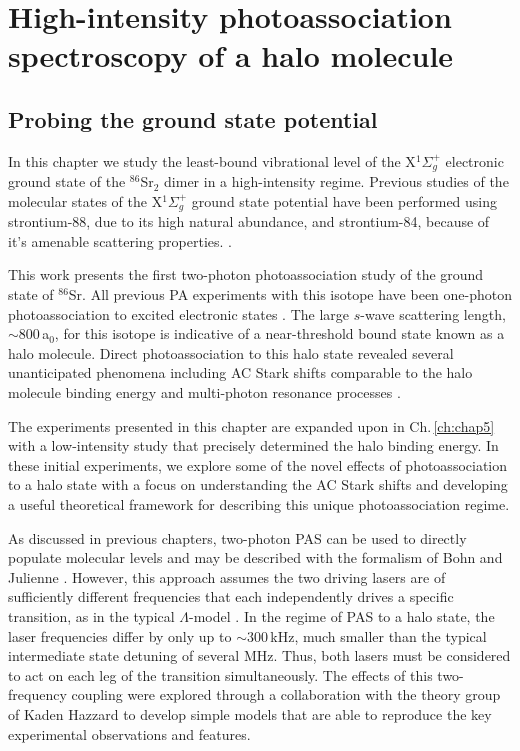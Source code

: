 \chapter{High-intensity photoassociation spectroscopy of a halo molecule} \label{ch:chap4}
\section{Probing the ground state potential} \label{sec:highE_intro}
In this chapter we study the least-bound vibrational level of the X$^1\Sigma_g^+$ electronic ground state of the $^{86}$Sr$_2$ dimer in a high-intensity regime.
Previous studies of the molecular states of the X$^1\Sigma_g^+$ ground state potential have been performed using strontium-88, due to its high natural abundance, and strontium-84, because of it's amenable scattering properties. \cite{Reinaudi2012, McGuyer2014, McGuyer2015a, rom12, Stellmer2012}.

This work presents the first two-photon photoassociation study of the ground state of $^{86}$Sr.
All previous PA experiments with this isotope have been one-photon photoassociation to excited electronic states \cite{Mickelson2005,Borkowski2014a,Reschovsky2018}.
The large $s$-wave scattering length, $\sim$800\,a$_0$, for this isotope is indicative of a near-threshold bound state known as a halo molecule.
Direct photoassociation to this halo state revealed several unanticipated phenomena including AC Stark shifts comparable to the halo molecule binding energy and multi-photon resonance processes \cite{Kon2018}.

The experiments presented in this chapter are expanded upon in Ch.\,\ref{ch:chap5} with a low-intensity study that precisely determined the halo binding energy. 
In these initial experiments, we explore some of the novel effects of photoassociation to a halo state with a focus on understanding the AC Stark shifts and developing a useful theoretical framework for describing this unique photoassociation regime.

As discussed in previous chapters, two-photon PAS can be used to directly populate molecular levels and may be described with the formalism of Bohn and Julienne \cite{PhysRevLett.74.1315,Bohn1999}.
However, this approach assumes the two driving lasers are of sufficiently different frequencies that each independently drives a specific transition, as in the typical $\Lambda$-model \cite{Wynar2000, Bohn1996}.
In the regime of PAS to a halo state, the laser frequencies differ by only up to $\sim\!300$\,kHz, much smaller than the typical intermediate state detuning of several MHz.
Thus, both lasers must be considered to act on each leg of the transition simultaneously.
The effects of this two-frequency coupling were explored through a collaboration with the theory group of Kaden Hazzard to develop simple models that are able to reproduce the key experimental observations and features.

